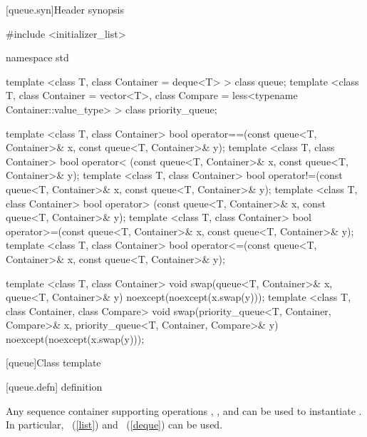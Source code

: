 [queue.syn]{Header  synopsis}%

\begin{codeblock}
#include <initializer_list>

namespace std {
  template <class T, class Container = deque<T> > class queue;
  template <class T, class Container = vector<T>,
            class Compare = less<typename Container::value_type> >
    class priority_queue;

  template <class T, class Container>
    bool operator==(const queue<T, Container>& x, const queue<T, Container>& y);
  template <class T, class Container>
    bool operator< (const queue<T, Container>& x, const queue<T, Container>& y);
  template <class T, class Container>
    bool operator!=(const queue<T, Container>& x, const queue<T, Container>& y);
  template <class T, class Container>
    bool operator> (const queue<T, Container>& x, const queue<T, Container>& y);
  template <class T, class Container>
    bool operator>=(const queue<T, Container>& x, const queue<T, Container>& y);
  template <class T, class Container>
    bool operator<=(const queue<T, Container>& x, const queue<T, Container>& y);

  template <class T, class Container>
    void swap(queue<T, Container>& x, queue<T, Container>& y) noexcept(noexcept(x.swap(y)));
  template <class T, class Container, class Compare>
    void swap(priority_queue<T, Container, Compare>& x,
              priority_queue<T, Container, Compare>& y) noexcept(noexcept(x.swap(y)));
}
\end{codeblock}

[queue]{Class template }

[queue.defn]{ definition}

\pnum
{}%
Any sequence container supporting operations
,
,
and
can be used to instantiate
.
In particular,
~(\ref{list})
and
~(\ref{deque})
can be used.

